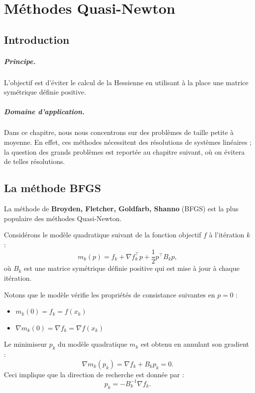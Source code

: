 \chapter{Méthodes Quasi-Newton}
\label{chap:quasi-newton}

\section{Introduction}

\paragraph{Principe.}
L'objectif est d'éviter le calcul de la Hessienne en utilisant à la place une matrice symétrique définie positive.

\paragraph{Domaine d'application.}
Dans ce chapitre, nous nous concentrons sur des problèmes de taille petite à moyenne. En effet, ces méthodes nécessitent des résolutions de systèmes linéaires ; la question des grands problèmes est reportée au chapitre suivant, où on évitera de telles résolutions.

\section{La méthode BFGS}
\label{sec:bfgs}

La méthode de \textbf{Broyden, Fletcher, Goldfarb, Shanno} (BFGS) est la plus populaire des méthodes Quasi-Newton.

Considérons le modèle quadratique suivant de la fonction objectif $f$ à l'itération $k$ :
\begin{equation}
    m_k(p) = f_k + \nabla f_k^\top p + \frac{1}{2} p^\top B_k p,
\end{equation}
où $B_k$ est une matrice symétrique définie positive qui est mise à jour à chaque itération.

Notons que le modèle vérifie les propriétés de consistance suivantes en $p=0$ :
\begin{itemize}
    \item $m_k(0) = f_k = f(x_k)$
    \item $\nabla m_k(0) = \nabla f_k = \nabla f(x_k)$
\end{itemize}

Le minimiseur $p_k$ du modèle quadratique $m_k$ est obtenu en annulant son gradient :
\begin{equation}
    \nabla m_k(p_k) = \nabla f_k + B_k p_k = 0.
\end{equation}
Ceci implique que la direction de recherche est donnée par :
\begin{equation}
    p_k = -B_k^{-1} \nabla f_k.
\end{equation}

